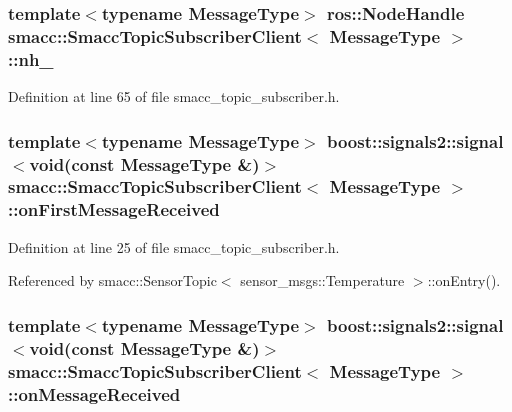 \subsubsection[{\texorpdfstring{nh\+\_\+}{nh_}}]{\setlength{\rightskip}{0pt plus 5cm}template$<$typename Message\+Type$>$ ros\+::\+Node\+Handle {\bf smacc\+::\+Smacc\+Topic\+Subscriber\+Client}$<$ Message\+Type $>$\+::nh\+\_\+\hspace{0.3cm}{\ttfamily [protected]}}\hypertarget{classsmacc_1_1SmaccTopicSubscriberClient_aed36e84de0628e1a8769be5f87664b59}{}\label{classsmacc_1_1SmaccTopicSubscriberClient_aed36e84de0628e1a8769be5f87664b59}


Definition at line 65 of file smacc\+\_\+topic\+\_\+subscriber.\+h.

\subsubsection[{\texorpdfstring{on\+First\+Message\+Received}{onFirstMessageReceived}}]{\setlength{\rightskip}{0pt plus 5cm}template$<$typename Message\+Type$>$ boost\+::signals2\+::signal$<$void(const Message\+Type \&)$>$ {\bf smacc\+::\+Smacc\+Topic\+Subscriber\+Client}$<$ Message\+Type $>$\+::on\+First\+Message\+Received}\hypertarget{classsmacc_1_1SmaccTopicSubscriberClient_ac18bfc587bbaad6b150ce4bf9cdb56ed}{}\label{classsmacc_1_1SmaccTopicSubscriberClient_ac18bfc587bbaad6b150ce4bf9cdb56ed}


Definition at line 25 of file smacc\+\_\+topic\+\_\+subscriber.\+h.



Referenced by smacc\+::\+Sensor\+Topic$<$ sensor\+\_\+msgs\+::\+Temperature $>$\+::on\+Entry().

\subsubsection[{\texorpdfstring{on\+Message\+Received}{onMessageReceived}}]{\setlength{\rightskip}{0pt plus 5cm}template$<$typename Message\+Type$>$ boost\+::signals2\+::signal$<$void(const Message\+Type \&)$>$ {\bf smacc\+::\+Smacc\+Topic\+Subscriber\+Client}$<$ Message\+Type $>$\+::on\+Message\+Received}\hypertarget{classsmacc_1_1SmaccTopicSubscriberClient_a4260d955152200804e9c51a1098965c8}{}\label{classsmacc_1_1SmaccTopicSubscriberClient_a4260d955152200804e9c51a1098965c8}


